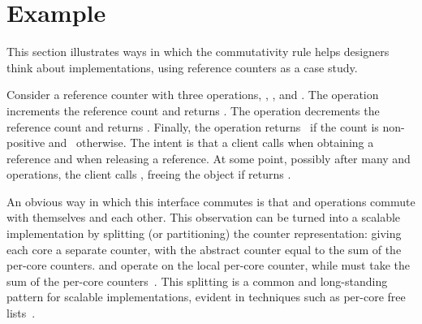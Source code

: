 \section{Example}
\label{sec:example}

This section illustrates ways in which the commutativity rule helps
designers think about implementations, using reference counters as a
case study.

Consider a reference counter with three operations, , ,
and .
%
The  operation increments the reference count and returns
\OK.
%
The  operation decrements the reference count and returns
\OK.
%
Finally, the  operation returns \TRUE\ if the count is
non-positive and \FALSE\ otherwise.
%
The intent is that a client calls  when obtaining a reference
and  when releasing a reference.  At some point, possibly after
many  and  operations, the client
calls , freeing the object if  returns \TRUE.

An obvious way in which this interface commutes is that  and
 operations commute with themselves and each other. This
observation can be turned into a scalable implementation by splitting
(or partitioning) the counter representation: giving each core a
separate counter, with the abstract counter equal to the sum
of the per-core counters.  and  operate on the local
per-core counter, while  must take the sum of the per-core
counters~\cite{XXX}. This splitting is a common and long-standing
pattern for scalable implementations, evident in techniques such as
per-core free lists~\cite{XXX}.

